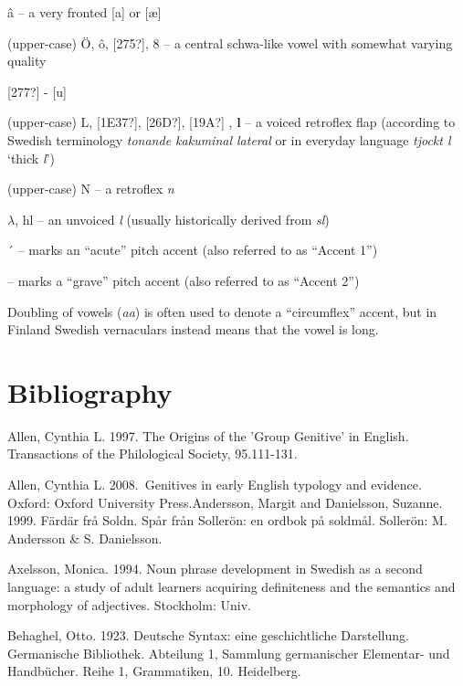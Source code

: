 â – a very fronted [a] or [æ]

(upper-case) Ö, ô, [275?], \textsc{8  – }a central schwa-like vowel with somewhat varying quality

[277?] - [u]

(upper-case) L, [1E37?], [26D?], [19A?] , \textbf{l }– a voiced retroflex flap (according to Swedish terminology \textit{tonande kakuminal lateral} or in everyday language \textit{tjockt l} ‘thick \textit{l}’)

(upper-case) N – a retroflex \textit{n}

$\lambda $, hl – an unvoiced \textit{l } (usually historically derived from \textit{sl})

´  – marks an “acute” pitch accent (also referred to as “Accent 1”)

{\textasciigrave} – marks a “grave” pitch accent (also referred to as “Accent 2”)

Doubling of vowels (\textit{aa}) is often used to denote a “circumflex” accent, but in Finland Swedish vernaculars instead means that the vowel is long.

\chapter[Bibliography]{Bibliography}

\begin{styleBodytextC}
Allen, Cynthia L. 1997. The Origins of the 'Group Genitive' in English. Transactions of the Philological Society, 95.111-131.

\end{styleBodytextC}

\begin{styleBodytextC}
Allen, Cynthia L. 2008.~Genitives in early English typology and evidence. Oxford: Oxford University Press.Andersson, Margit and Danielsson, Suzanne. 1999. Färdär frå Soldn. Spår från Sollerön: en ordbok på soldmål. Sollerön: M. Andersson \& S. Danielsson.

\end{styleBodytextC}

\begin{styleBodytextC}
Axelsson, Monica. 1994. Noun phrase development in Swedish as a second language: a study of adult learners acquiring definiteness and the semantics and morphology of adjectives. Stockholm: Univ.

\end{styleBodytextC}

\begin{styleBodytextC}
Behaghel, Otto. 1923. Deutsche Syntax: eine geschichtliche Darstellung. Germanische Bibliothek. Abteilung 1, Sammlung germanischer Elementar- und Handbücher. Reihe 1, Grammatiken, 10. Heidelberg.

\end{styleBodytextC}

